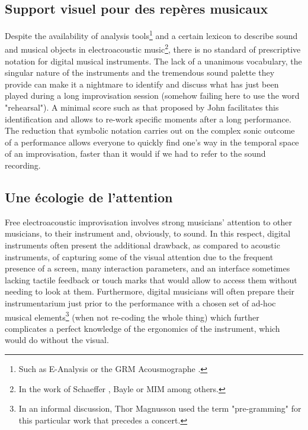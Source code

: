 \subsection{Support visuel pour des repères musicaux}

Despite the availability of analysis tools\footnote{Such as E-Analysis \cite{couprie_eanalysis:_2016} or the GRM Acousmographe \cite{favreau_lacousmographe_2010}.} and a certain lexicon to describe sound and musical objects in electroacoustic music\footnote{In the work of Schaeffer \cite{schaeffer_traite_2016}, Bayle \cite{bayle_musique_1993} or MIM \cite{delalande_les_1996} among others.}, there is no standard of prescriptive notation for digital musical instruments. The lack of a unanimous vocabulary, the singular nature of the instruments and the tremendous sound palette they provide can make it a nightmare to identify and discuss what has just been played during a long improvisation session (somehow failing here to use the word "rehearsal"). A minimal score such as that proposed by John facilitates this identification and allows to re-work specific moments after a long performance. The reduction that symbolic notation carries out on the complex sonic outcome of a performance allows everyone to quickly find one's way in the temporal space of an improvisation, faster than it would if we had to refer to the sound recording.

\subsection{Une écologie de l'attention}

Free electroacoustic improvisation involves strong musicians' attention to other musicians, to their instrument and, obviously, to sound. In this respect, digital instruments often present the additional drawback, as compared to acoustic instruments, of capturing some of the visual attention due to the frequent presence of a screen, many interaction parameters, and an interface sometimes lacking tactile feedback or touch marks that would allow to access them without needing to look at them. Furthermore, digital musicians will often prepare their instrumentarium just prior to the performance with a chosen set of ad-hoc musical elements\footnote{In an informal discussion, Thor Magnusson used the term "pre-gramming" for this particular work that precedes a concert.} (when not re-coding the whole thing) which further complicates a perfect knowledge of the ergonomics of the instrument, which would do without the visual.

